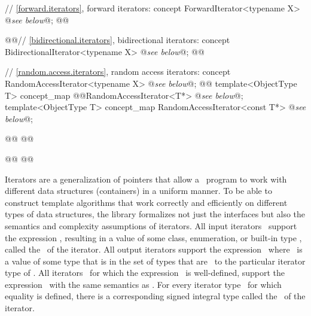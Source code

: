 \documentclass[american,twoside]{book}
\begin{document}
\begin{paras}
\begin{codeblock}
{  // \ref{forward.iterators}, forward iterators:
  concept ForwardIterator<typename X> @\textit{see below}@;
  @@

  @\textcolor{addclr}{}@// \ref{bidirectional.iterators}, bidirectional iterators:
  concept BidirectionalIterator<typename X> @\textit{see below}@;
  @@

  // \ref{random.access.iterators}, random access iterators:
  concept RandomAccessIterator<typename X> @\textit{see below}@;
  @@
  template<ObjectType T> concept_map @@RandomAccessIterator<T*> @\textit{see below}@;
  template<ObjectType T> concept_map RandomAccessIterator<const T*> @\textit{see below}@;

  @@
  @@

  @@
  @@
}
\end{codeblock}
\color{black}

\pnum
{}%
Iterators are a generalization of pointers that allow a \Cpp\ program to work with different data structures
(containers) in a uniform manner.
To be able to construct template algorithms that work correctly and
efficiently on different types of data structures, the library formalizes not just the interfaces but also the
semantics and complexity assumptions of iterators.
All input iterators
\
support the expression
,
resulting in a value of some class, enumeration, or built-in type
\tcode{T},
called the
\ 
of the iterator.
All output iterators support the expression
\
where
\tcode{o}\
is a value of some type that is in the set of types that are
\
to the particular iterator type of
.
All iterators
\tcode{i}\
for which the expression
\
is well-defined, support the expression
\tcode{i->m}\
with the same semantics as
\tcode{(*i).m}.
For every iterator type
\tcode{X}\
for which
equality is defined, there is a corresponding signed integral type called the
\ 
of the iterator.


\end{paras}
\end{document}
